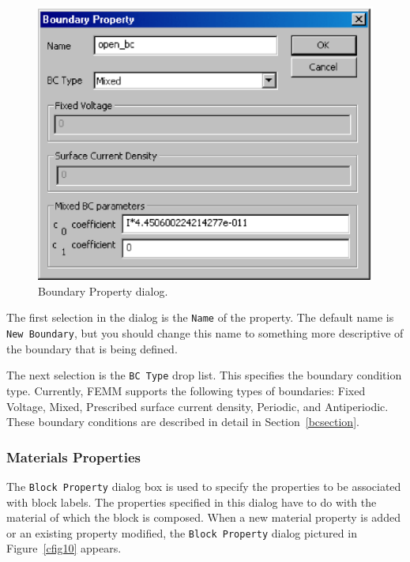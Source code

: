 \begin{figure}[htbp]
\centerline{\includegraphics{cd3.ps}}
\caption{Boundary Property dialog.}
\label{cfig9}
\end{figure}

The first selection in the dialog is the \texttt{Name} of the
property. The default name is {\tt New Boundary}, but you should
change this name to something more descriptive of the boundary that
is being defined.

The next selection is the \texttt{BC Type} drop list. This
specifies the boundary condition type. Currently, FEMM supports the
following types of boundaries: Fixed Voltage, Mixed, Prescribed surface current density,
Periodic, and Antiperiodic. These boundary conditions are
described in detail in Section~\ref{bcsection}.

\subsubsection{Materials Properties}

The \texttt{Block Property} dialog box is used to specify the
properties to be associated with block labels. The properties
specified in this dialog have to do with the material of which the
block is composed. When a new material property is added or an
existing property modified, the
\texttt{Block Property} dialog pictured in Figure~\ref{cfig10} appears.


